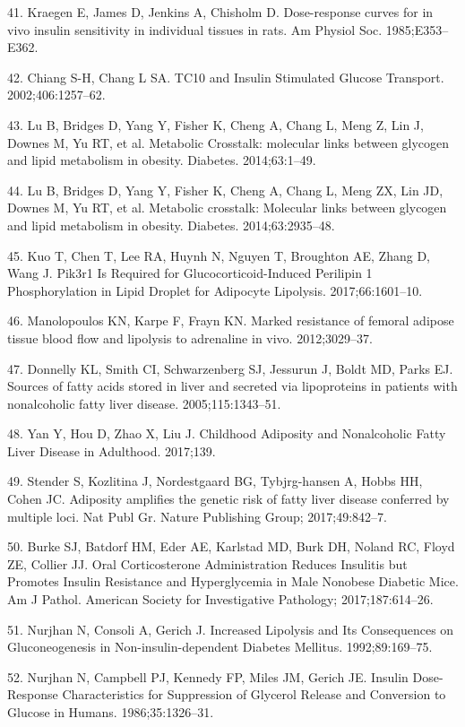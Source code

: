 \documentclass[11pt]{article} %
\begin{document}
41. Kraegen E, James D, Jenkins A, Chisholm D. Dose-response curves for
in vivo insulin sensitivity in individual tissues in rats. Am Physiol
Soc. 1985;E353--E362.

42. Chiang S-H, Chang L SA. TC10 and Insulin  Stimulated Glucose
Transport. 2002;406:1257--62.

43. Lu B, Bridges D, Yang Y, Fisher K, Cheng A, Chang L, Meng Z, Lin J,
Downes M, Yu RT, et al. Metabolic Crosstalk: molecular links between
glycogen and lipid metabolism in obesity. Diabetes. 2014;63:1--49.

44. Lu B, Bridges D, Yang Y, Fisher K, Cheng A, Chang L, Meng ZX, Lin
JD, Downes M, Yu RT, et al. Metabolic crosstalk: Molecular links between
glycogen and lipid metabolism in obesity. Diabetes. 2014;63:2935--48.

45. Kuo T, Chen T, Lee RA, Huynh N, Nguyen T, Broughton AE, Zhang D,
Wang J. Pik3r1 Is Required for Glucocorticoid-Induced Perilipin 1
Phosphorylation in Lipid Droplet for Adipocyte Lipolysis.
2017;66:1601--10.

46. Manolopoulos KN, Karpe F, Frayn KN. Marked resistance of femoral
adipose tissue blood flow and lipolysis to adrenaline in vivo.
2012;3029--37.

47. Donnelly KL, Smith CI, Schwarzenberg SJ, Jessurun J, Boldt MD, Parks
EJ. Sources of fatty acids stored in liver and secreted via lipoproteins
in patients with nonalcoholic fatty liver disease. 2005;115:1343--51.

48. Yan Y, Hou D, Zhao X, Liu J. Childhood Adiposity and Nonalcoholic
Fatty Liver Disease in Adulthood. 2017;139.

49. Stender S, Kozlitina J, Nordestgaard BG, Tybjrg-hansen A, Hobbs HH,
Cohen JC. Adiposity amplifies the genetic risk of fatty liver disease
conferred by multiple loci. Nat Publ Gr. Nature Publishing Group;
2017;49:842--7.

50. Burke SJ, Batdorf HM, Eder AE, Karlstad MD, Burk DH, Noland RC,
Floyd ZE, Collier JJ. Oral Corticosterone Administration Reduces
Insulitis but Promotes Insulin Resistance and Hyperglycemia in Male
Nonobese Diabetic Mice. Am J Pathol. American Society for Investigative
Pathology; 2017;187:614--26.

51. Nurjhan N, Consoli A, Gerich J. Increased Lipolysis and Its
Consequences on Gluconeogenesis in Non-insulin-dependent Diabetes
Mellitus. 1992;89:169--75.

52. Nurjhan N, Campbell PJ, Kennedy FP, Miles JM, Gerich JE. Insulin
Dose-Response Characteristics for Suppression of Glycerol Release and
Conversion to Glucose in Humans. 1986;35:1326--31.
\end{document}
